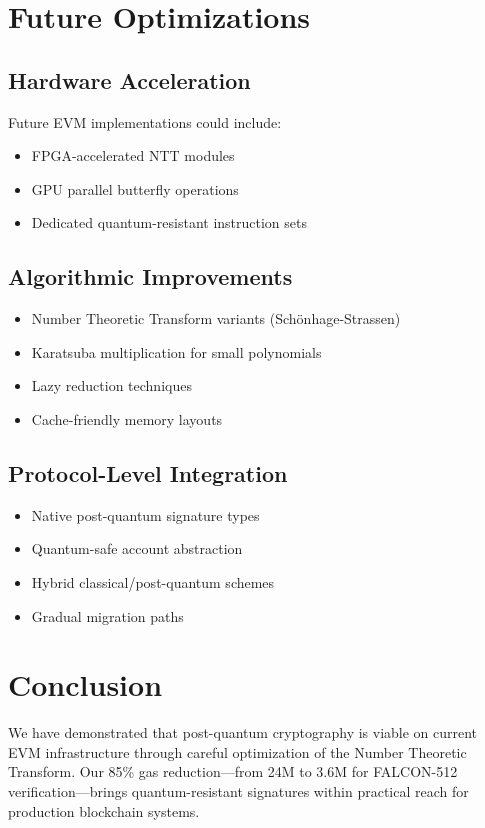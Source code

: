 \documentclass[11pt,a4paper]{article}
\begin{document}
\section{Future Optimizations}

\subsection{Hardware Acceleration}

Future EVM implementations could include:
\begin{itemize}
\item FPGA-accelerated NTT modules
\item GPU parallel butterfly operations
\item Dedicated quantum-resistant instruction sets
\end{itemize}

\subsection{Algorithmic Improvements}

\begin{itemize}
\item Number Theoretic Transform variants (Schönhage-Strassen)
\item Karatsuba multiplication for small polynomials
\item Lazy reduction techniques
\item Cache-friendly memory layouts
\end{itemize}

\subsection{Protocol-Level Integration}

\begin{itemize}
\item Native post-quantum signature types
\item Quantum-safe account abstraction
\item Hybrid classical/post-quantum schemes
\item Gradual migration paths
\end{itemize}

\section{Conclusion}

We have demonstrated that post-quantum cryptography is viable on current EVM infrastructure through careful optimization of the Number Theoretic Transform. Our 85\% gas reduction—from 24M to 3.6M for FALCON-512 verification—brings quantum-resistant signatures within practical reach for production blockchain systems.
\end{document}
